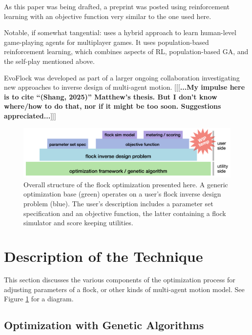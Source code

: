 \documentclass[letterpaper]{article}
\begin{document}
As this paper was being drafted, a preprint was posted \citep{brambati_learning_2025} using reinforcement learning with an objective function very similar to the one used here. 

Notable, if somewhat tangential: \citet{jaderberg_human-level_2019} uses a hybrid approach to learn human-level game-playing agents for multiplayer games. It uses population-based reinforcement learning, which combines aspects of RL, population-based GA, and the self-play mentioned above.

EvoFlock was developed as part of a larger ongoing collaboration investigating new approaches to inverse design of multi-agent motion. [[[\textbf{...My impulse here is to cite ``(Shang, 2025)'' Matthew's thesis. But I don't know where/how to do that, nor if it might be too soon. Suggestions appreciated...}]]]


\begin{figure}[b!]
    \centering
    \includegraphics[width=0.9\linewidth]{images/temp_system_blocks.png}
    \caption{Overall structure of the flock optimization presented here. A generic optimization base (green) operates on a user's flock inverse design problem (blue). The user's description includes a parameter set specification and an objective function, the latter containing a flock simulator and score keeping utilities.}
    \label{fig:system_blocks}
\end{figure}



\section{Description of the Technique}
\label{sec:Description}

This section discusses the various components of the optimization process for adjusting parameters of a flock, or other kinds of multi-agent motion model. See Figure \ref{fig:system_blocks} for a diagram.

\subsection{Optimization with Genetic Algorithms}
\label{subsec:Optimization_with_GA}
\end{document}
